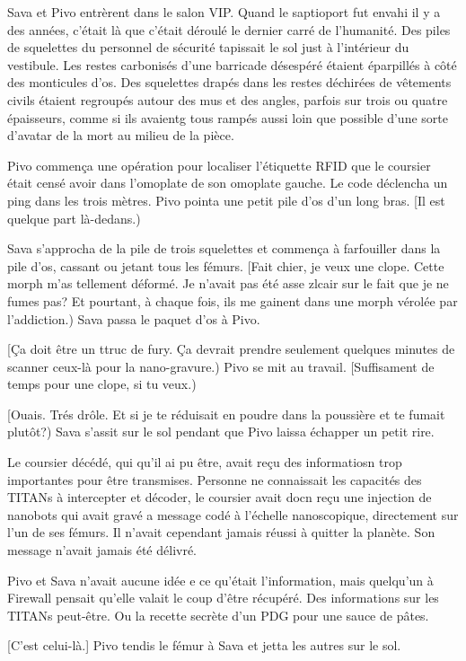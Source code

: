 Sava et Pivo entrèrent dans le salon VIP. Quand le saptioport fut envahi il y a des années, c'était là que c'était déroulé le dernier carré de l'humanité. Des piles de squelettes du personnel de sécurité tapissait le sol just à l'intérieur du vestibule. Les restes carbonisés d'une barricade désespéré étaient éparpillés à côté des monticules d'os. Des squelettes drapés dans les restes déchirées de vêtements civils étaient regroupés autour des mus et des angles, parfois sur trois ou quatre épaisseurs, comme si ils avaientg tous rampés aussi loin que possible d'une sorte d'avatar de la mort au milieu de la pièce. 

Pivo commença une opération pour localiser  l'étiquette RFID que le coursier était censé avoir dans l'omoplate de son omoplate gauche. Le code déclencha un ping dans les trois mètres. Pivo pointa une petit pile d'os d'un long bras. [Il est quelque part là-dedans.) 

Sava s'approcha de la pile de trois squelettes et commença à farfouiller dans la pile d'os, cassant ou jetant tous les fémurs. [Fait chier, je veux une clope. Cette morph m'as tellement déformé. Je n'avait pas été asse zlcair sur le fait que je ne fumes pas? Et pourtant, à chaque fois, ils me gainent dans une morph vérolée par l'addiction.) Sava passa le paquet d'os à Pivo. 

[Ça doit être un ttruc de fury. Ça devrait prendre seulement quelques minutes de scanner ceux-là pour la nano-gravure.) Pivo se mit au travail. [Suffisament de temps pour une clope, si tu veux.) 

[Ouais. Trés drôle. Et si je te réduisait en poudre dans la poussière et te fumait plutôt?) Sava s'assit sur le sol pendant que Pivo laissa échapper un petit rire. 

Le coursier décédé, qui qu'il ai pu être, avait reçu des informatiosn trop importantes pour être transmises. Personne ne connaissait les capacités des TITANs à intercepter et décoder, le coursier avait docn reçu une injection de nanobots qui avait gravé a message codé à l'échelle nanoscopique, directement sur l'un de ses fémurs. Il n'avait cependant jamais réussi à quitter la planète. Son message n'avait jamais été délivré. 

Pivo et Sava n'avait aucune idée e ce qu'était l'information, mais quelqu'un à Firewall  pensait qu'elle valait le coup d'être récupéré. Des informations sur les TITANs peut-être. Ou la recette secrète d'un PDG pour une sauce de pâtes. 

[C'est celui-là.] Pivo tendis le fémur à Sava et jetta les autres sur le sol. 

